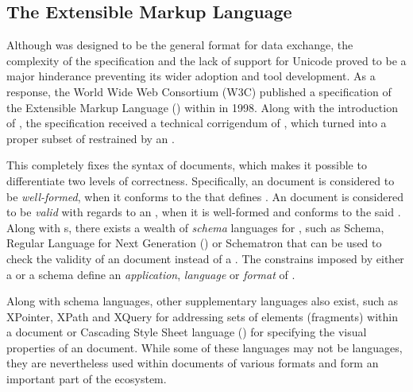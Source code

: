 \documentclass{book}
\begin{document}
      \subsection{The Extensible Markup Language}
        Although  was designed to be the general format for data
        exchange, the complexity of the specification and the lack of support
        for Unicode proved to be a major hinderance preventing its wider
        adoption and tool development. As a response, the World Wide Web
        Consortium (W3C) published a specification of the Extensible Markup
        Language () within \cite{bray98} in 1998. Along with the
        introduction of , the  specification received
        a technical corrigendum of \cite{goldfarb97:webSGML}, which turned
         into a proper subset of  restrained by an
         .
        
        This  completely fixes the syntax of 
        documents, which makes it possible to differentiate two levels of
        correctness. Specifically, an  document is considered to be
        \emph{well-formed}, when it conforms to the  
        that defines . An  document is considered to
        be \emph{valid} with regards to an  , when it
        is well-formed and conforms to the said  .
        Along with s, there exists a wealth of \emph{schema}
        languages for , such as  Schema, Regular
        Language for  Next Generation () or
        Schematron that can be used to check the validity of an 
        document instead of a . The constrains imposed by either a
         or a schema define an \emph{application}, \emph{language}
        or \emph{format} of .

        
        Along with schema languages, other supplementary languages also exist,
        such as XPointer, XPath and XQuery for addressing sets of elements
        (fragments) within a  document or Cascading Style Sheet
        language () for specifying the visual properties of an
         document. While some of these languages may not be
         languages, they are nevertheless used within documents of
        various  formats and form an important part of the
         ecosystem.
\end{document}
